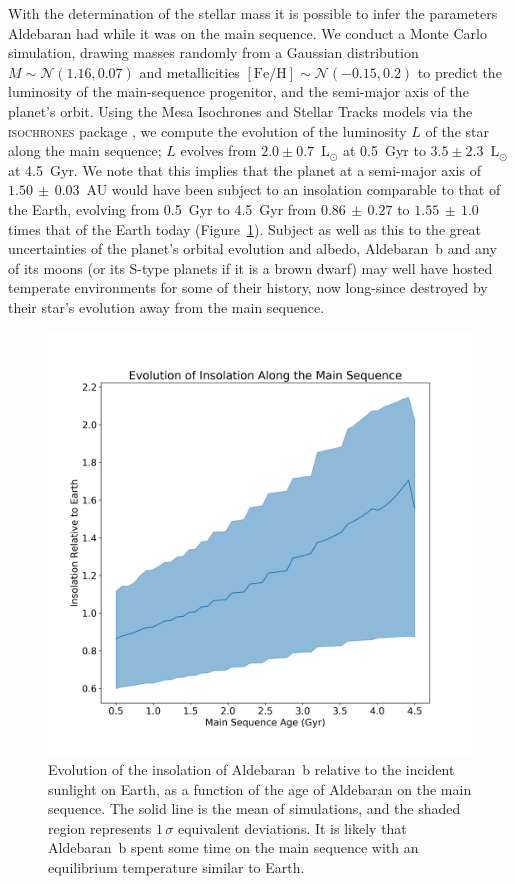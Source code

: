 \documentclass[modern]{aastex61}
\newcommand{\lsun}{\mbox{$\mathrm{L}_{\odot}$}\xspace}
\begin{document}
With the determination of the stellar mass it is possible to infer the parameters Aldebaran had while it was on the main sequence. We conduct a Monte Carlo simulation, drawing masses randomly from a Gaussian distribution $M \sim \mathcal{N}(1.16,0.07)$ and metallicities $[\text{Fe}/\text{H}] \sim \mathcal{N}(-0.15,0.2)$ \citep{decin2003} to predict the luminosity of the main-sequence progenitor, and the semi-major axis of the planet's orbit.
Using the Mesa Isochrones and Stellar Tracks \citep[MIST:][]{mist0,mist1} models via the \textsc{isochrones} package \citep{isochrones}, we compute the evolution of the luminosity $L$ of the star along the main sequence; $L$ evolves from $2.0 \pm 0.7$~\lsun at 0.5~Gyr to $3.5 \pm 2.3$~\lsun at 4.5~Gyr.
We note that this implies that the planet at a semi-major axis of $1.50\, \pm\, 0.03$~AU would have been subject to an insolation comparable to that of the Earth, evolving from 0.5~Gyr to 4.5~Gyr from $0.86\, \pm\, 0.27$ to $1.55 \,\pm\,1.0$ times that of the Earth today (Figure~\ref{insolation}). Subject as well as this to the great uncertainties of the planet's orbital evolution and albedo, Aldebaran~b and any of its moons (or its S-type planets if it is a brown dwarf) may well have hosted temperate environments for some of their history, now long-since destroyed by their star's evolution away from the main sequence.


\begin{figure}
\centering
\includegraphics[width=\textwidth]{insolation.png}
\caption{Evolution of the insolation of Aldebaran~b relative to the incident sunlight on Earth, as a function of the age of Aldebaran on the main sequence. The solid line is the mean of simulations, and the shaded region represents $1\,\sigma$ equivalent deviations. It is likely that Aldebaran~b spent some time on the main sequence with an equilibrium temperature similar to Earth.}
\label{insolation}
\end{figure}
\end{document}
